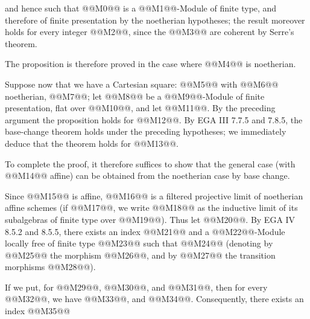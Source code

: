 and hence such that @@M0@@ is a @@M1@@-Module of finite type, and therefore of finite presentation by the noetherian hypotheses; the result moreover holds for every integer @@M2@@, since the @@M3@@ are coherent by Serre's theorem.

The proposition is therefore proved in the case where @@M4@@ is noetherian.

Suppose now that we have a Cartesian square:
@@M5@@
with @@M6@@ noetherian, @@M7@@; let @@M8@@ be a @@M9@@-Module of finite presentation, flat over @@M10@@, and let @@M11@@. By the preceding argument the proposition holds for @@M12@@. By EGA III 7.7.5 and 7.8.5, the base-change theorem holds under the preceding hypotheses; we immediately deduce that the theorem holds for @@M13@@.

To complete the proof, it therefore suffices to show that the general case (with @@M14@@ affine) can be obtained from the noetherian case by base change.

Since @@M15@@ is affine, @@M16@@ is a filtered projective limit of noetherian affine schemes (if @@M17@@, we write @@M18@@ as the inductive limit of its subalgebras of finite type over @@M19@@). Thus let @@M20@@. By EGA IV 8.5.2 and 8.5.5, there exists an index @@M21@@ and a @@M22@@-Module locally free of finite type @@M23@@ such that @@M24@@ (denoting by @@M25@@ the morphism @@M26@@, and by @@M27@@ the transition morphisms @@M28@@).

If we put, for @@M29@@, @@M30@@, and @@M31@@, then for every @@M32@@, we have @@M33@@, and @@M34@@. Consequently, there exists an index @@M35@@
